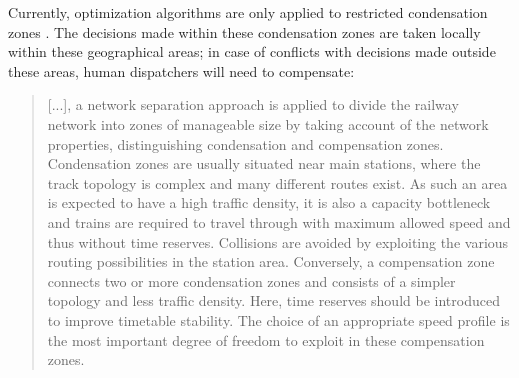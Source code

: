\documentclass{article}
\begin{document}
Currently, optimization algorithms are only applied to restricted condensation zones \cite{caimi2009}. The decisions made within these condensation zones are taken locally within these geographical areas; in case of conflicts with decisions made outside these areas, human dispatchers will need to compensate:
%
\begin{quote}
    [...], a network separation approach is applied to divide the railway network into zones of manageable size by taking account of the network properties, distinguishing condensation and compensation zones. Condensation zones are usually situated near main stations, where the track topology is complex and many different routes exist. As such an area is expected to have a high traffic density, it is also a capacity bottleneck and trains are required to travel through with maximum allowed speed and thus without time reserves. Collisions are avoided by exploiting the various routing possibilities in the station area. Conversely, a compensation zone connects two or more condensation zones and consists of a simpler topology and less traffic density. Here, time reserves should be introduced to improve timetable stability. The choice of an appropriate speed profile is the most important degree of freedom to exploit in these compensation zones. \cite{caimi2009}
\end{quote}
\end{document}
